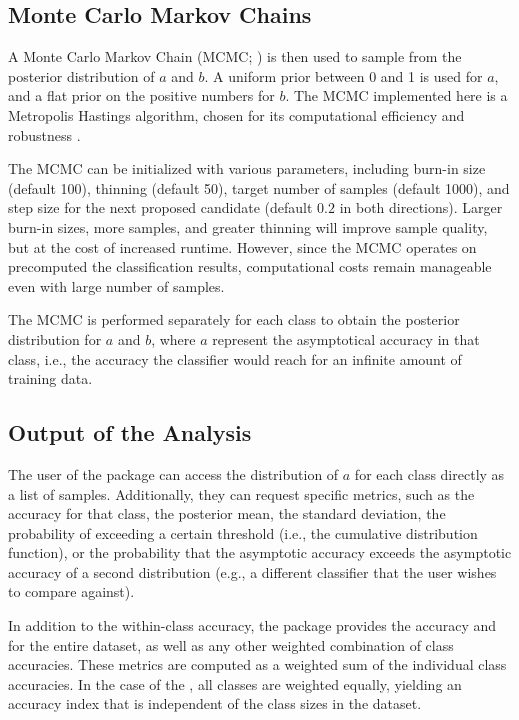 \documentclass[article]{jss}
\begin{document}
\subsection{Monte Carlo Markov Chains} \label{sec:mcmc}
A Monte Carlo Markov Chain (MCMC; \citep{metropolis1953equation}) is then used to sample from the posterior distribution of $a$ and $b$. A uniform prior between 0 and 1 is used for $a$, and a flat prior on the positive numbers for $b$. The MCMC implemented here is a Metropolis Hastings algorithm, chosen for its computational efficiency and robustness \citep{hastings1970monte}.

The MCMC can be initialized with various parameters, including burn-in size (default 100), thinning (default 50), target number of samples (default 1000), and step size for the next proposed candidate (default $0.2$ in both directions). Larger burn-in sizes, more samples, and greater thinning will improve sample quality, but at the cost of increased runtime. However, since the MCMC operates on precomputed the classification results, computational costs remain manageable even with large number of samples.

The MCMC is performed separately for each class to obtain the posterior distribution for $a$ and $b$, where $a$ represent the asymptotical accuracy in that class, i.e., the accuracy the classifier would reach for an infinite amount of training data.

\subsection{Output of the Analysis} \label{sec:output_analysis}
The user of the package can access the distribution of $a$ for each class directly as a list of samples. Additionally, they can request specific metrics, such as the  accuracy for that class, the posterior mean, the standard deviation, the probability of exceeding a certain threshold (i.e., the cumulative distribution function), or the probability that the asymptotic accuracy exceeds the asymptotic accuracy of a second distribution (e.g., a different classifier that the user wishes to compare against).

In addition to the within-class accuracy, the package provides the accuracy and  for the entire dataset, as well as any other weighted combination of class accuracies. These metrics are computed as a weighted sum of the individual class accuracies. In the case of the , all classes are weighted equally, yielding an accuracy index that is independent of the class sizes in the dataset.
\end{document}
